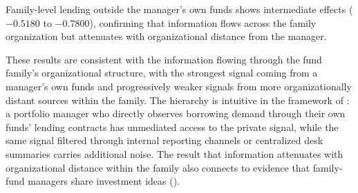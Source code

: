 Family-level lending outside the manager's own funds shows intermediate effects ($-0.5180$ to $-0.7800$), confirming that information flows across the family organization but attenuates with organizational distance from the manager.

These results are consistent with the information flowing through the fund family's organizational structure, with the strongest signal coming from a manager's own funds and progressively weaker signals from more organizationally distant sources within the family. The hierarchy is intuitive in the framework of \citet{Nurisso2026}: a portfolio manager who directly observes borrowing demand through their own funds' lending contracts has unmediated access to the private signal, while the same signal filtered through internal reporting channels or centralized desk summaries carries additional noise. The result that information attenuates with organizational distance within the family also connects to evidence that family-fund managers share investment ideas (\citealp{pool2012no}).
